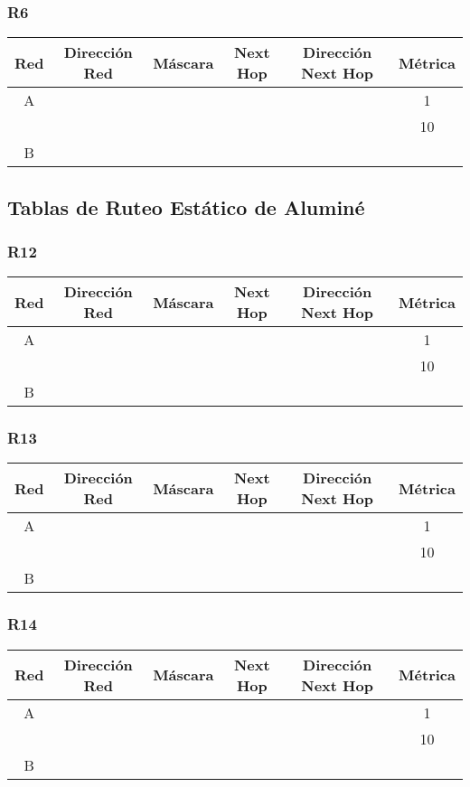 \documentclass[12pt, a4paper, spanish]{article}
\begin{document}
\subsubsection{R6}
\begin{center}
\begin{tabular}{|c|c|c|c|c|c|}
	\hline
	Red & Dirección Red & Máscara & Next Hop & Dirección Next Hop & Métrica \\
	\hline
	\hline
	A &  &  &  &  & 1\\
 	  &  &  &  &  & 10 \\
	\hline	
	B & & & & &\\
	\hline
\end{tabular}
\end{center}

\subsection{Tablas de Ruteo Estático de Aluminé}
\subsubsection{R12}
\begin{center}
\begin{tabular}{|c|c|c|c|c|c|}
	\hline
	Red & Dirección Red & Máscara & Next Hop & Dirección Next Hop & Métrica \\
	\hline
	\hline
	A &  &  &  &  & 1\\
 	  &  &  &  &  & 10 \\
	\hline	
	B & & & & &\\
	\hline
\end{tabular}
\end{center}

\subsubsection{R13}
\begin{center}
\begin{tabular}{|c|c|c|c|c|c|}
	\hline
	Red & Dirección Red & Máscara & Next Hop & Dirección Next Hop & Métrica \\
	\hline
	\hline
	A &  &  &  &  & 1\\
 	  &  &  &  &  & 10 \\
	\hline	
	B & & & & &\\
	\hline
\end{tabular}
\end{center}

\subsubsection{R14}
\begin{center}
\begin{tabular}{|c|c|c|c|c|c|}
	\hline
	Red & Dirección Red & Máscara & Next Hop & Dirección Next Hop & Métrica \\
	\hline
	\hline
	A &  &  &  &  & 1\\
 	  &  &  &  &  & 10 \\
	\hline	
	B & & & & &\\
	\hline
\end{tabular}
\end{center}
\end{document}
